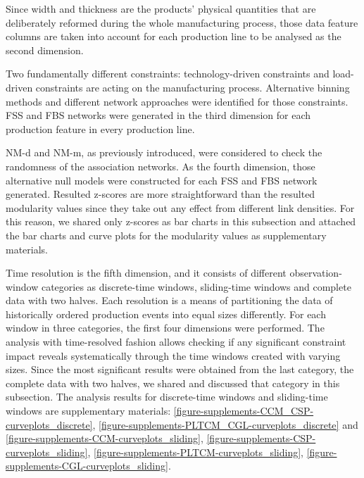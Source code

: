 Since width and thickness are the products' physical quantities that are deliberately reformed during the whole manufacturing process, those data feature columns are taken into account for each production line to be analysed as the second dimension. 

{\color{red}Two fundamentally different constraints: technology-driven constraints and load-driven constraints are acting on the manufacturing process. Alternative binning methods and different network approaches were identified for those constraints. FSS and FBS networks were generated in the third dimension for each production feature in every production line.}

NM-d and NM-m, as previously introduced, were considered to check the randomness of the association networks. As the fourth dimension, those alternative null models were constructed for each FSS and FBS network generated. Resulted z-scores are more straightforward than the resulted modularity values since they take out any effect from different link densities. For this reason, we shared only z-scores as bar charts in this subsection and attached the bar charts and curve plots for the modularity values as supplementary materials.

Time resolution is the fifth dimension, and it consists of different observation-window categories as discrete-time windows, sliding-time windows and complete data with two halves. Each resolution is a means of partitioning the data of historically ordered production events into equal sizes differently. For each window in three categories, the first four dimensions were performed. The analysis with time-resolved fashion allows checking if any significant constraint impact reveals systematically through the time windows created with varying sizes. Since the most significant results were obtained from the last category, the complete data with two halves, we shared and discussed that category in this subsection. The analysis results for discrete-time windows and sliding-time windows are supplementary materials: \ref{figure-supplements-CCM_CSP-curveplots_discrete}, \ref{figure-supplements-PLTCM_CGL-curveplots_discrete} and \ref{figure-supplements-CCM-curveplots_sliding}, \ref{figure-supplements-CSP-curveplots_sliding}, \ref{figure-supplements-PLTCM-curveplots_sliding}, \ref{figure-supplements-CGL-curveplots_sliding}.

